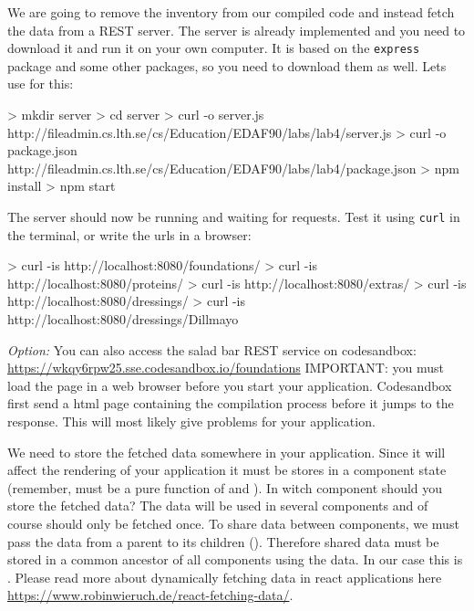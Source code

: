 \documentclass[fleqn, article, a4paper]{memoir}
\begin{document}
\begin{Assignments}

\item We are going to remove the inventory from our compiled code and instead fetch the data from a REST server. The server is already implemented and you need to download it and run it on your own computer. It is based on the \texttt{express} package and some other packages, so you need to download them as well. Lets use  for this:
\begin{Code}
> mkdir server
> cd server
> curl -o server.js http://fileadmin.cs.lth.se/cs/Education/EDAF90/labs/lab4/server.js
> curl -o package.json 
          http://fileadmin.cs.lth.se/cs/Education/EDAF90/labs/lab4/package.json
> npm install
> npm start
\end{Code}
The server should now be running and waiting for requests. Test it using \texttt{curl} in the terminal, or write the urls in a browser:
\begin{Code}
> curl -is http://localhost:8080/foundations/
> curl -is http://localhost:8080/proteins/
> curl -is http://localhost:8080/extras/
> curl -is http://localhost:8080/dressings/
> curl -is http://localhost:8080/dressings/Dillmayo
\end{Code}

\noindent \emph{Option:} You can also access the salad bar REST service on codesandbox: \url{https://wkqy6rpw25.sse.codesandbox.io/foundations} IMPORTANT: you must load the page in a web browser before you start your application. Codesandbox first send a html page containing the compilation process before it jumps to the  response. This will most likely give problems for your application.

\item We need to store the fetched data somewhere in your application. Since it will affect the rendering of your application it must be stores in a component state (remember,  must be a pure function of  and ). In witch component should you store the fetched data? The data will be used in several components and of course should only be fetched once. To share data between components, we must pass the data from a parent to its children (). Therefore shared data must be stored in a common ancestor of all components using the data. In our case this is . Please read more about dynamically fetching data in react applications here \url{https://www.robinwieruch.de/react-fetching-data/}.


\end{Assignments}
\end{document}
